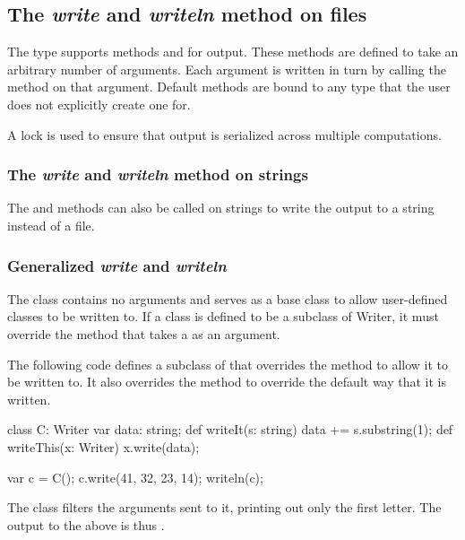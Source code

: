 \subsection{The {\em write} and {\em writeln} method on files}
\label{filewrite}

The  type supports methods  and 
for output.  These methods are defined to take an arbitrary number of
arguments.  Each argument is written in turn by calling
the  method on that argument.
Default  methods are bound to any type that the user
does not explicitly create one for.

A lock is used to ensure that output is serialized across multiple
computations.

\subsubsection{The {\em write} and {\em writeln} method on strings}
\label{stringwrite}

The  and  methods can also be called on
strings to write the output to a string instead of a file.

\subsubsection{Generalized {\em write} and {\em writeln}}
\label{writer}

The  class contains no arguments and serves as a base
class to allow user-defined classes to be written to.  If a class is
defined to be a subclass of Writer, it must override
the  method that takes a  as an argument.

\begin{example}
The following code defines a subclass of  that overrides
the  method to allow it to be written to.  It also
overrides the  method to override the default way that
it is written.
\begin{chapel}
class C: Writer {
  var data: string;
  def writeIt(s: string) {
    data += s.substring(1);
  }
  def writeThis(x: Writer) {
    x.write(data);
  }
}

var c = C();
c.write(41, 32, 23, 14);
writeln(c);
\end{chapel}
The  class filters the arguments sent to it, printing out only
the first letter.  The output to the above is thus .
\end{example}


